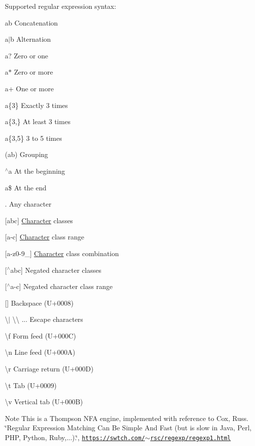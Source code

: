 Supported regular expression syntax\+:
\begin{DoxyItemize}
\item {\ttfamily ab} Concatenation
\item {\ttfamily a$\vert$b} Alternation
\item {\ttfamily a}? Zero or one
\item {\ttfamily a$\ast$} Zero or more
\item {\ttfamily a+} One or more
\item {\ttfamily a\{3\}} Exactly 3 times
\item {\ttfamily a\{3},\} At least 3 times
\item {\ttfamily a\{3},5\} 3 to 5 times
\item {\ttfamily }(ab) Grouping
\item {\ttfamily $^\wedge$a} At the beginning
\item {\ttfamily a\$} At the end
\item {\ttfamily }. Any character
\item {\ttfamily }\mbox{[}abc\mbox{]} \hyperlink{structCharacter}{Character} classes
\item {\ttfamily }\mbox{[}a-\/c\mbox{]} \hyperlink{structCharacter}{Character} class range
\item {\ttfamily }\mbox{[}a-\/z0-\/9\+\_\+\mbox{]} \hyperlink{structCharacter}{Character} class combination
\item {\ttfamily }\mbox{[}$^\wedge$abc\mbox{]} Negated character classes
\item {\ttfamily }\mbox{[}$^\wedge$a-\/c\mbox{]} Negated character class range
\item {\ttfamily }\mbox{[}{\bfseries }\mbox{]} Backspace (U+0008)
\item {\ttfamily \textbackslash{}}$\vert$ \textbackslash{}\textbackslash{} ... Escape characters
\item {\ttfamily \textbackslash{}f} Form feed (U+000C)
\item {\ttfamily \textbackslash{}n} Line feed (U+000A)
\item {\ttfamily \textbackslash{}r} Carriage return (U+000D)
\item {\ttfamily \textbackslash{}t} Tab (U+0009)
\item {\ttfamily \textbackslash{}v} Vertical tab (U+000B)
\end{DoxyItemize}

\begin{DoxyNote}{Note}
This is a Thompson N\+FA engine, implemented with reference to Cox, Russ. \char`\"{}\+Regular Expression Matching Can Be Simple And Fast (but is slow in Java, Perl, P\+H\+P, Python, Ruby,...).\char`\"{}, \href{https://swtch.com/~rsc/regexp/regexp1.html}{\tt https\+://swtch.\+com/$\sim$rsc/regexp/regexp1.\+html} 
\end{DoxyNote}



